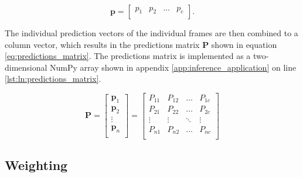 \begin{equation}
  \boldsymbol{p} =
  \begin{bmatrix}
    p_1 & p_2 & \dots & p_c \\
  \end{bmatrix}.
  \label{eq:prediction_vector}
\end{equation}

The individual prediction vectors of the individual frames are then combined to a column vector, which results in the predictions matrix $\boldsymbol{P}$ shown in equation \ref{eq:predictions_matrix}.
The predictions matrix is implemented as a two-dimensional NumPy array shown in appendix \ref{app:inference_application} on line \ref{lst:ln:predictions_matrix}.

\begin{equation}
  \boldsymbol{P} =
  \begin{bmatrix}
    \boldsymbol{p}_1 \\
    \boldsymbol{p}_2 \\
    \vdots \\
    \boldsymbol{p}_n \\
  \end{bmatrix} =
  \begin{bmatrix}
    P_{11} & P_{12} & \dots & P_{1c} \\
    P_{21} & P_{22} & \dots & P_{2c} \\
    \vdots & \vdots & \ddots & \vdots \\
    P_{n1} & P_{n2} & \dots & P_{nc} \\
  \end{bmatrix}
  \label{eq:predictions_matrix}
\end{equation}

\subsection{Weighting}
\label{subsec:inference:app:weighting}

